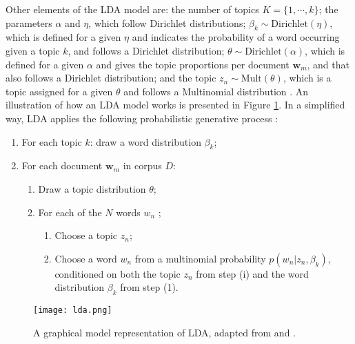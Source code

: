 Other elements of the LDA model are: the number of topics $K = \{ 1, \cdots, k \}$; the parameters $\alpha$ and $\eta$, which follow Dirichlet distributions; $\beta_{k} \sim \text{Dirichlet}(\eta)$, which is defined for a given $\eta$ and indicates the probability of a word occurring given a topic $k$, and follows a Dirichlet distribution; $\theta \sim \text{Dirichlet}(\alpha)$, which is defined for a given $\alpha$ and gives the topic proportions per document $\mathbf{w}_{m}$, and that also follows a Dirichlet distribution; and the topic $z_{n} \sim \text{Mult}(\theta)$, which is a topic assigned for a given $\theta$ and follows a Multinomial distribution \citep{blei_latent_2003, blei_topic_2009, grun_topicmodels_2011}. An illustration of how an LDA model works is presented in Figure \ref{fig:lda}. In a simplified way, LDA applies the following probabilistic generative process \citep{blei_topic_2009, grun_topicmodels_2011, ponweiser_latent_2012}:

\begin{enumerate}
\item For each topic $k$: draw a word distribution $\beta_{k}$;
\item For each document $\mathbf{w}_{m}$ in corpus $D$:
\begin{enumerate}
	\item Draw a topic distribution $\theta$;
	\item For each of the $N$ words $w_{n}$	;
	\begin{enumerate}
		\item Choose a topic $z_{n}$;
		\item Choose a word $w_{n}$ from a multinomial probability $p(w_{n} | z_{n}, \beta_{k})$, conditioned on both the topic $z_{n}$ from step (i) and the word distribution $\beta_{k}$ from step (1).
	\end{enumerate}
\end{enumerate}
\end{enumerate} 

\begin{figure}[!ht]
	\centering
	\texttt{[image: lda.png]}
	\caption{A graphical model representation of LDA, adapted from \cite{blei_latent_2003} and \cite{blei_topic_2009}.}
	\label{fig:lda}
\end{figure}

%
%

